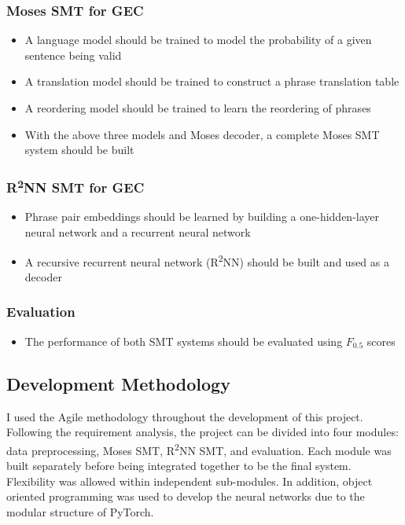 \documentclass[12pt,a4paper,twoside]{report}
\begin{document}
\subsubsection{Moses SMT for GEC}
\begin{itemize}
    \item A language model should be trained to model the probability of a given sentence being valid
    \item A translation model should be trained to construct a phrase translation table
    \item A reordering model should be trained to learn the reordering of phrases
    \item With the above three models and Moses decoder, a complete Moses SMT system should be built
\end{itemize}

\subsubsection{R\textsuperscript{2}NN SMT for GEC}
\begin{itemize}
    \item Phrase pair embeddings should be learned by building a one-hidden-layer neural network and a recurrent neural network
    \item A recursive recurrent neural network (R\textsuperscript{2}NN) should be built and used as a decoder
\end{itemize}

\subsubsection{Evaluation}
\begin{itemize}
    \item The performance of both SMT systems should be evaluated using $F_{0.5}$ scores
\end{itemize}

\subsection{Development Methodology}
I used the Agile methodology throughout the development of this project. Following the requirement analysis, the project can be divided into four modules: data preprocessing, Moses SMT, R\textsuperscript{2}NN SMT, and evaluation. Each module was built separately before being integrated together to be the final system. Flexibility was allowed within independent sub-modules. In addition, object oriented programming was used to develop the neural networks due to the modular structure of PyTorch.
\end{document}
